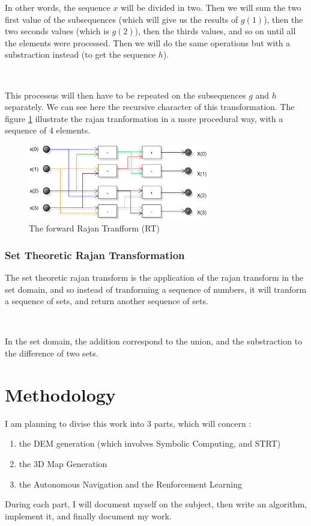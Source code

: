 \documentclass[11pt,a4paper]{article}
\begin{document}
In other words, the sequence $x$ will be divided in two. Then we will sum the two first value of the subsequences (which will give us the results of $g(1)$), then the two seconds values (which is $g(2)$), then the thirds values, and so on until all the elements were processed. Then we will do the same operations but with a substraction instead (to get the sequence $h$).

~~

This processus will then have to be repeated on the subsequences $g$ and $h$ separately. We can see here the recursive character of this transformation. The figure \ref{fig:diagram:rajan transform} illustrate the rajan tranformation in a more procedural way, with a sequence of 4 elements. 

\begin{figure}[H]
	\centering
	\includegraphics[width=0.7\textwidth]{images/diagrammes/rajan_transform}
	\caption{The forward Rajan Tranfform (RT)}
	\label{fig:diagram:rajan transform}	
\end{figure}



\subsubsection{Set Theoretic Rajan Transformation}

The set theoretic rajan transform is the application of the rajan transform in the set domain, and so instead of tranforming a sequence of numbers, it will tranform a sequence of sets, and return another sequence of sets. 

~~

In the set domain, the addition correspond to the union, and the substraction to the difference of two sets.



\section{Methodology}

I am planning to divise this work into 3 parts, which will concern : 
\begin{enumerate} 
	\item the DEM generation (which involves Symbolic Computing, and STRT)
	\item the 3D Map Generation 
	\item the Autonomous Navigation and the Renforcement Learning 
\end{enumerate}

During each part, I will document myself on the subject, then write an algorithm, implement it, and finally document my work. 


\printbibliography
\printglossaries
\end{document}
